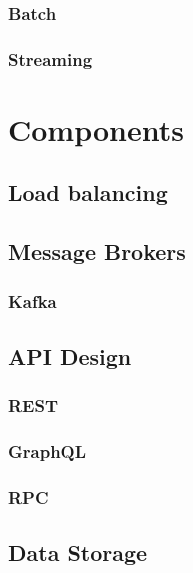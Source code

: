 \documentclass[a4paper, 11pt]{book}
\begin{document}
    \subsubsection{Batch}

    \subsubsection{Streaming}



    \section{Components}
    \lipsum[3]

    \subsection{Load balancing}

    \subsection{Message Brokers}

    \subsubsection{Kafka}

    \subsection{API Design}

    \subsubsection{REST}

    \subsubsection{GraphQL}

    \subsubsection{RPC}

    \subsection{Data Storage}
\end{document}
